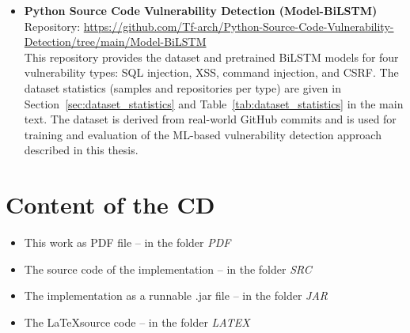 \begin{itemize}
	\item \textbf{Python Source Code Vulnerability Detection (Model-BiLSTM)} \\
	Repository: \url{https://github.com/Tf-arch/Python-Source-Code-Vulnerability-Detection/tree/main/Model-BiLSTM} \\
	This repository provides the dataset and pretrained BiLSTM models for four vulnerability types: SQL injection, XSS, command injection, and CSRF. The dataset statistics (samples and repositories per type) are given in Section~\ref{sec:dataset_statistics} and Table~\ref{tab:dataset_statistics} in the main text. The dataset is derived from real-world GitHub commits and is used for training and evaluation of the ML-based vulnerability detection approach described in this thesis.
\end{itemize}

\chapter{Content of the CD}

\begin{itemize}
	\item This work as PDF file -- in the folder \emph{PDF}
	\item The source code of the implementation -- in the folder \emph{SRC}
	\item The implementation as a runnable .jar file -- in the folder \emph{JAR}
	\item The \LaTeX source code -- in the folder \emph{LATEX}
\end{itemize}





